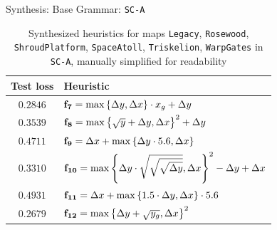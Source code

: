 \documentclass[aspectratio=169,usenames,dvipsnames]{beamer}
\renewcommand{\max}{\operatornamewithlimits{max}\limits}
\numberwithin{equation}{section}
\numberwithin{theorem}{section}
\numberwithin{lem}{section}
\numberwithin{df}{section}
\begin{document}

\begin{frame}{Synthesis: Base Grammar: {\tt SC-A}}

\begin{table}[htbp]
	\centering
	{
		\begin{tabular}{c|l}
			\toprule
			{\bf Test loss} & {\bf Heuristic}\\
			\midrule
			$0.2846$ & 
			$\mathbf{f_{7}} = \max\left\{\Delta y,\Delta x\right\} \cdot x_g + \Delta y$\\
			$0.3539$ & 
			$\mathbf{f_{8}} = \max\left\{\sqrt{y} + \Delta y,\Delta x\right\}^2 + \Delta y$\\
			$0.4711$ & 
			$\mathbf{f_{9}} = \Delta x + \max\left\{\Delta y \cdot 5.6,\Delta x\right\}$\\
			$0.3310$ & 
			$\mathbf{f_{10}} = \max\left\{\Delta y \cdot \sqrt{\sqrt{\sqrt{\Delta y}}},\Delta x\right\}^2 - \Delta y + \Delta x$\\
			$0.4931$ & 
			$\mathbf{f_{11}} = \Delta x + \max\left\{1.5 \cdot \Delta y,\Delta x\right\} \cdot 5.6$\\
			$0.2679$ & 
			$\mathbf{f_{12}} = \max\left\{\Delta y + \sqrt{y_g},\Delta x\right\}^2$\\
			\bottomrule
		\end{tabular}}
	\caption{Synthesized heuristics for maps {\tt Legacy}, {\tt Rosewood}, {\tt ShroudPlatform}, {\tt SpaceAtoll},  {\tt Triskelion}, {\tt WarpGates} in {\tt SC-A}, manually simplified for readability}
	\label{tab:building_blocks_from_SC-A}
\end{table}


\end{frame}

\end{document}
